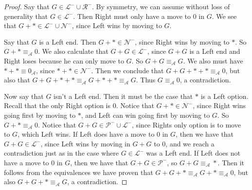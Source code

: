 \documentclass{amsart}
\theoremstyle{plain}
\theoremstyle{definition}
\theoremstyle{remark}
\numberwithin{equation}{section}
\numberwithin{thm}{section}
\begin{document}
\begin{proof}
 Say that $G \in \mathcal{L}^-\cup\mathcal{R}^-$. By symmetry, we can assume without loss of generality that $G \in\mathcal{L}^-$. Then Right must only have a move to $0$ in $G$. We see that $G+*\in\mathcal{L}^- \cup\mathcal{N}^-$, since Left wins by moving to $G$. 
 
 Say that $G$ is a Left end. Then $G+* \in \mathcal{N}^-$, since Right wins by moving to $*$. So $G+* \equiv_{\mathscr{A}} 0$. We also calculate that $G+G \in \mathcal{L}^-$, since $G+G$ is a Left end and Right loses because he can only move to $G$. So $G+G \equiv_{\mathscr{A}} G$. We also must have $*+* \equiv 0_{\mathscr{A}}$, since $*+* \in \mathcal{N}^-$. Then we conclude that $G+G+*+* \equiv_{\mathscr{A}} 0$, but also that $G+G+*+* \equiv_{\mathscr{A}} G+*+* \equiv_{\mathscr{A}} G$. Thus $G \equiv_{\mathscr{A}} 0$, a contradiction.

 Now say that $G$ isn't a Left end. Then it must be the case that $*$ is a Left option. Recall that the only Right option is $0$. 
Notice that $G+* \in \mathcal{N}^-$, since Right wins going first by moving to $*$, and Left can win going first by moving to $G$. So $G+* \equiv_{\mathscr{A}} 0$. 
Notice that $G+G \in \mathcal{P}^-\cup\mathcal{L}^-$, since Rights only option is to move to $G$, which Left wins.
If Left does have a move to $0$ in $G$, then we have that $G+G \in \mathcal{L}^-$, since Left wins by moving in $G+G$ to $0$, and we reach a contradiction just as in the case where $G\in\mathcal{L}^-$ was a Left end.
If Left does not have a move to $0$ in $G$, then we have that $G+G \in \mathcal{P}^-$, so $G+G \equiv_{\mathscr{A}} *$. 
Then it follows from the equivalences we have proven that $G+G + * \equiv_{\mathscr{A}} G+* \equiv_{\mathscr{A}} 0$, but also $G+G+* \equiv_{\mathscr{A}} G$, a contradiction.
\end{proof}
\end{document}
